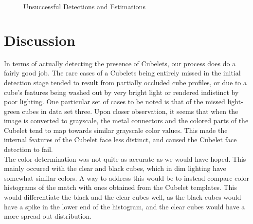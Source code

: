 \documentclass[conference]{IEEEtran}
\begin{document}
\begin{figure}[!t]
\centerline{
\label{fig_first_case}
\hfil
{}}
\caption{Unsuccessful Detections and Estimations}
\label{fig_sim}
\end{figure}

\section{Discussion}

In terms of actually detecting the presence of Cubelets, our process does do a fairly good job.  The rare cases of a Cubelets being entirely missed in the initial detection stage tended to result from partially occluded cube profiles, or due to a cube's features being washed out by very bright light or rendered indistinct by poor lighting.  One particular set of cases to be noted is that of the missed light-green cubes in data set three.  Upon closer observation, it seems that when the image is converted to grayscale, the metal connectors and the colored parts of the Cubelet tend to map towards similar grayscale color values.  This made the internal features of the Cubelet face less distinct, and caused the Cubelet face detection to fail.\\

The color determination was not quite as accurate as we would have hoped.  This mainly occured with the clear and black cubes, which in dim lighting have somewhat similar colors.  A way to address this would be to instead compare color histograms of the match with ones obtained from the Cubelet templates.  This would differentiate the black and the clear cubes well, as the black cubes would have a spike in the lower end of the histogram, and the clear cubes would have a more spread out distribution.\\
\end{document}
